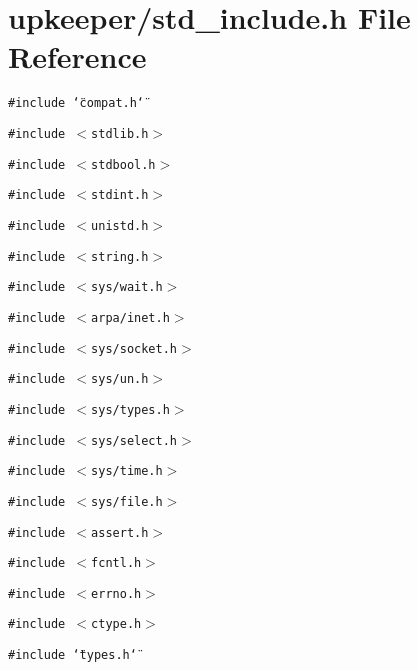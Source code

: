 \section{upkeeper/std\_\-include.h File Reference}
\label{std__include_8h}
{\tt \#include \char`\"{}compat.h\char`\"{}}\par
{\tt \#include $<$stdlib.h$>$}\par
{\tt \#include $<$stdbool.h$>$}\par
{\tt \#include $<$stdint.h$>$}\par
{\tt \#include $<$unistd.h$>$}\par
{\tt \#include $<$string.h$>$}\par
{\tt \#include $<$sys/wait.h$>$}\par
{\tt \#include $<$arpa/inet.h$>$}\par
{\tt \#include $<$sys/socket.h$>$}\par
{\tt \#include $<$sys/un.h$>$}\par
{\tt \#include $<$sys/types.h$>$}\par
{\tt \#include $<$sys/select.h$>$}\par
{\tt \#include $<$sys/time.h$>$}\par
{\tt \#include $<$sys/file.h$>$}\par
{\tt \#include $<$assert.h$>$}\par
{\tt \#include $<$fcntl.h$>$}\par
{\tt \#include $<$errno.h$>$}\par
{\tt \#include $<$ctype.h$>$}\par
{\tt \#include \char`\"{}types.h\char`\"{}}\par
